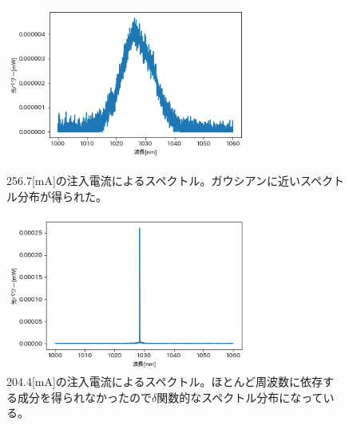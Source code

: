 \documentclass[titlepage]{jsarticle}
\begin{document}
\begin{figure}[htbp]
 \begin{minipage}{0.5\hsize}
  \begin{center}
   \includegraphics[width=80mm]{256_7[mA].png}
  \end{center}
  \caption{256.7[mA]の注入電流によるスペクトル。ガウシアンに近いスペクトル分布が得られた。}
  \label{fig:256_7}
 \end{minipage}
 \begin{minipage}{0.5\hsize}
  \begin{center}
   \includegraphics[width=80mm]{204_4[mA].png}
  \end{center}
  \caption{204.4[mA]の注入電流によるスペクトル。ほとんど周波数に依存する成分を得られなかったので$\delta$関数的なスペクトル分布になっている。}
  \label{fig:204_4}
 \end{minipage}
\end{figure}
\end{document}
